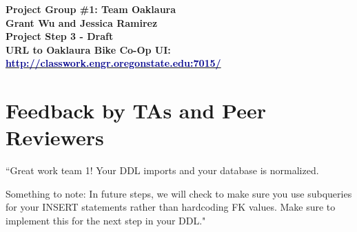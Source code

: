 \documentclass{article}
\begin{document}
\begin{center}
\large\textcolor{primarycolor}{\textbf{Project Group \#1: Team Oaklaura}}\\[0.3cm]
\large\textbf{Grant Wu and Jessica Ramirez}\\[0.3cm]
\huge\textbf{Project Step 3 - Draft}\\[1cm]

\large\textbf{URL to Oaklaura Bike Co-Op UI:}\\[0.5cm]
\large\href{http://classwork.engr.oregonstate.edu:7015/}{\textcolor{darkblue}{\textbf{http://classwork.engr.oregonstate.edu:7015/}}}\\[1.25cm]
\end{center}
\section{Feedback by TAs and Peer Reviewers}
\begin{tcolorbox}[colback=secondarycolor, colframe=primarycolor, title=\textbf{Step 2: TA Review - Madelyn Lazar}]
``Great work team 1! Your DDL imports and your database is normalized. 

\vspace{0.2cm}
Something to note: In future steps, we will check to make sure you use subqueries for your INSERT statements rather than hardcoding FK values. Make sure to implement this for the next step in your DDL."
\end{tcolorbox}

\vspace{0.5cm}
\end{document}
